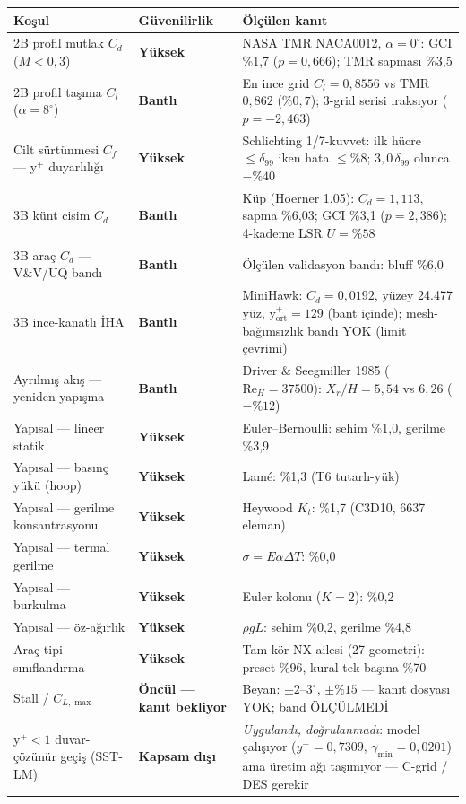 \documentclass[11pt,a4paper]{article}
\newcommand{\yuksek}{\textcolor{iyi}{\textbf{Yüksek}}}
\newcommand{\bantli}{\textcolor{orta}{\textbf{Bantlı}}}
\newcommand{\oncul}{\textcolor{orta}{\textbf{Öncül --- kanıt bekliyor}}}
\newcommand{\disi}{\textcolor{kotu}{\textbf{Kapsam dışı}}}
\begin{document}
\begingroup
\footnotesize
\setlength{\tabcolsep}{4pt}
\renewcommand{\arraystretch}{1.15}
\begin{longtable}{@{}p{50mm}p{20mm}p{80mm}@{}}
\toprule
\textbf{Koşul} & \textbf{Güvenilirlik} & \textbf{Ölçülen kanıt} \\
\midrule
\endhead
\rowcolor{iyibg}
2B profil mutlak $C_d$ ($M<0{,}3$) & \yuksek &
NASA TMR NACA0012, $\alpha=0^\circ$: GCI \%1{,}7 ($p=0{,}666$); TMR sapması \%3{,}5 \\
\rowcolor{ortabg}
2B profil taşıma $C_l$ ($\alpha=8^\circ$) & \bantli &
En ince grid $C_l=0{,}8556$ vs TMR $0{,}862$ ($\%0{,}7$); 3-grid serisi ıraksıyor
($p=-2{,}463$) \\
\rowcolor{iyibg}
Cilt sürtünmesi $C_f$ --- y$^+$ duyarlılığı & \yuksek &
Schlichting 1/7-kuvvet: ilk hücre $\leq\delta_{99}$ iken hata $\leq\%8$;
$3{,}0\,\delta_{99}$ olunca $-\%40$ \\
\rowcolor{ortabg}
3B künt cisim $C_d$ & \bantli &
Küp (Hoerner 1{,}05): $C_d=1{,}113$, sapma \%6{,}03; GCI \%3{,}1 ($p=2{,}386$);
4-kademe LSR $U=\%58$ \\
\rowcolor{ortabg}
3B araç $C_d$ --- V\&V/UQ bandı & \bantli & Ölçülen validasyon bandı: bluff \%6{,}0 \\
\rowcolor{ortabg}
3B ince-kanatlı İHA & \bantli &
MiniHawk: $C_d=0{,}0192$, yüzey 24.477 yüz, y$^+_{\mathrm{ort}}=129$ (bant
içinde); mesh-bağımsızlık bandı YOK (limit çevrimi) \\
\rowcolor{ortabg}
Ayrılmış akış --- yeniden yapışma & \bantli &
Driver \& Seegmiller 1985 ($\mathrm{Re}_H=37500$): $X_r/H=5{,}54$ vs $6{,}26$
($-\%12$) \\
\rowcolor{iyibg}
Yapısal --- lineer statik & \yuksek & Euler--Bernoulli: sehim \%1{,}0, gerilme \%3{,}9 \\
\rowcolor{iyibg}
Yapısal --- basınç yükü (hoop) & \yuksek & Lamé: \%1{,}3 (T6 tutarlı-yük) \\
\rowcolor{iyibg}
Yapısal --- gerilme konsantrasyonu & \yuksek & Heywood $K_t$: \%1{,}7 (C3D10, 6637 eleman) \\
\rowcolor{iyibg}
Yapısal --- termal gerilme & \yuksek & $\sigma=E\alpha\Delta T$: \%0{,}0 \\
\rowcolor{iyibg}
Yapısal --- burkulma & \yuksek & Euler kolonu ($K=2$): \%0{,}2 \\
\rowcolor{iyibg}
Yapısal --- öz-ağırlık & \yuksek & $\rho g L$: sehim \%0{,}2, gerilme \%4{,}8 \\
\rowcolor{iyibg}
Araç tipi sınıflandırma & \yuksek &
Tam kör NX ailesi (27 geometri): preset \%96, kural tek başına \%70 \\
\rowcolor{ortabg}
Stall / $C_{L,\max}$ & \oncul & Beyan: $\pm2$--$3^\circ$, $\pm\%15$ --- kanıt dosyası YOK; band ÖLÇÜLMEDİ \\
\rowcolor{kotubg}
y$^+<1$ duvar-çözünür geçiş (SST-LM) & \disi & \emph{Uygulandı, doğrulanmadı}: model çalışıyor ($y^+=0{,}7309$, $\gamma_{\min}=0{,}0201$) ama üretim ağı taşımıyor --- C-grid / DES gerekir \\
\bottomrule
\end{longtable}
\endgroup
\end{document}
